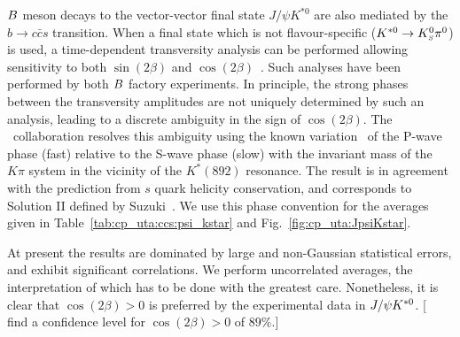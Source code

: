 \label{sec:cp_uta:ccs:vv}

$B$ meson decays to the vector-vector final state $J/\psi K^{*0}$
are also mediated by the $b \to c \bar c s$ transition.
When a final state which is not flavour-specific ($K^{*0} \to K^0_{\scriptscriptstyle S} \pi^0$) is used,
a time-dependent transversity analysis can be performed 
allowing sensitivity to both 
$\sin(2\beta)$ and $\cos(2\beta)$~\cite{Dunietz:1990cj}.
Such analyses have been performed by both $B$ factory experiments.
In principle, the strong phases between the transversity amplitudes
are not uniquely determined by such an analysis, 
leading to a discrete ambiguity in the sign of $\cos(2\beta)$.
The \babar\ collaboration resolves 
this ambiguity using the known variation~\cite{Aston:1987ir}
of the P-wave phase (fast) relative to the S-wave phase (slow) 
with the invariant mass of the $K\pi$ system 
in the vicinity of the $K^*(892)$ resonance. 
The result is in agreement with the prediction from 
$s$ quark helicity conservation,
and corresponds to Solution II defined by Suzuki~\cite{Suzuki:2001za}.
We use this phase convention for the averages given in 
Table~\ref{tab:cp_uta:ccs:psi_kstar} and Fig.~\ref{fig:cp_uta:JpsiKstar}.



At present the results are dominated by 
large and non-Gaussian statistical errors,
and exhibit significant correlations.
We perform uncorrelated averages, 
the interpretation of which has to be done with the greatest care. 
Nonetheless, it is clear that $\cos(2\beta)>0$ is preferred 
by the experimental data in $J/\psi K^{*0}$.
[\babar~\cite{Aubert:2004cp} 
find a confidence level for $\cos(2\beta)>0$ of $89\%$.]


